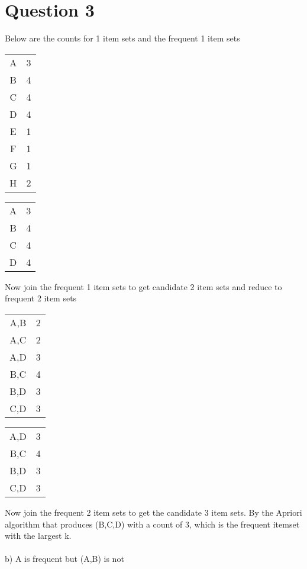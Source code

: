 \documentclass{article}
\begin{document}
\section{Question 3}
Below are the counts for 1 item sets and the frequent 1 item sets
\begin{center}
\begin{tabular}{ |c|c| }
 \hline
 A & 3 \\
 B & 4 \\
 C & 4 \\
 D & 4 \\
 E & 1 \\
 F & 1 \\
 G & 1 \\
 H & 2 \\
 \hline
\end{tabular}
\quad
\begin{tabular}{ |c|c| }
 \hline
 A & 3 \\
 B & 4 \\
 C & 4 \\
 D & 4 \\
 \hline
\end{tabular}
\end{center}
Now join the frequent 1 item sets to get candidate 2 item sets and reduce to frequent 2 item sets
\begin{center}
\begin{tabular}{ |c|c| }
 \hline
 A,B & 2 \\
 A,C & 2 \\
 A,D & 3 \\
 B,C & 4 \\
 B,D & 3 \\
 C,D & 3 \\
 \hline
\end{tabular}
\quad
\begin{tabular}{ |c|c| }
 \hline
 A,D & 3 \\
 B,C & 4 \\
 B,D & 3 \\
 C,D & 3 \\
 \hline
\end{tabular}
\end{center}
Now join the frequent 2 item sets to get the candidate 3 item sets. By the Apriori algorithm that produces (B,C,D) with a count of 3, which is the frequent itemset with the largest k.\\\\
b) A is frequent but (A,B) is not\\\\
\end{document}
